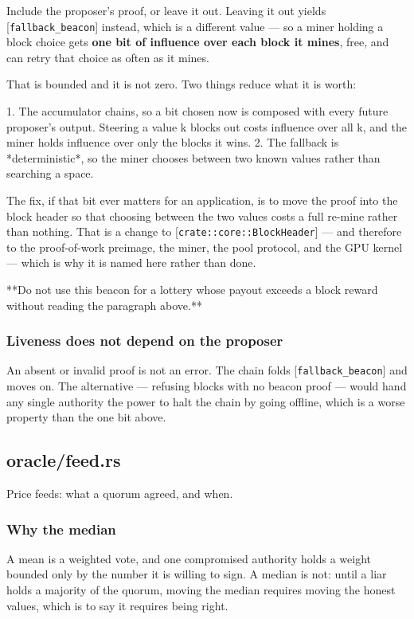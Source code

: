 \documentclass[11pt,a4paper]{article}
\begin{document}
Include the proposer's proof, or leave it out. Leaving it out yields
[\texttt{fallback\_beacon}] instead, which is a different value — so a miner holding
a block choice gets \textbf{one bit of influence over each block it mines}, free,
and can retry that choice as often as it mines.

That is bounded and it is not zero. Two things reduce what it is worth:

1. The accumulator chains, so a bit chosen now is composed with every future
   proposer's output. Steering a value k blocks out costs influence over all
   k, and the miner holds influence over only the blocks it wins.
2. The fallback is *deterministic*, so the miner chooses between two known
   values rather than searching a space.

The fix, if that bit ever matters for an application, is to move the proof
into the block header so that choosing between the two values costs a full
re-mine rather than nothing. That is a change to [\texttt{crate::core::BlockHeader}]
— and therefore to the proof-of-work preimage, the miner, the pool protocol,
and the GPU kernel — which is why it is named here rather than done.

**Do not use this beacon for a lottery whose payout exceeds a block reward
without reading the paragraph above.**

\subsubsection{Liveness does not depend on the proposer}

An absent or invalid proof is not an error. The chain folds
[\texttt{fallback\_beacon}] and moves on. The alternative — refusing blocks with no
beacon proof — would hand any single authority the power to halt the chain
by going offline, which is a worse property than the one bit above.

\subsection{oracle/feed.rs}
Price feeds: what a quorum agreed, and when.

\subsubsection{Why the median}

A mean is a weighted vote, and one compromised authority holds a weight
bounded only by the number it is willing to sign. A median is not: until a
liar holds a majority of the quorum, moving the median requires moving the
honest values, which is to say it requires being right.
\end{document}
